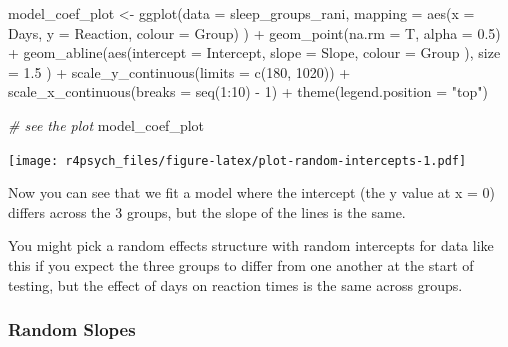 \documentclass[
]{book}
\newenvironment{Shaded}{\begin{snugshade}}{\end{snugshade}}
\newcommand{\AttributeTok}[1]{\textcolor[rgb]{0.77,0.63,0.00}{#1}}
\newcommand{\CommentTok}[1]{\textcolor[rgb]{0.56,0.35,0.01}{\textit{#1}}}
\newcommand{\DecValTok}[1]{\textcolor[rgb]{0.00,0.00,0.81}{#1}}
\newcommand{\FloatTok}[1]{\textcolor[rgb]{0.00,0.00,0.81}{#1}}
\newcommand{\FunctionTok}[1]{\textcolor[rgb]{0.00,0.00,0.00}{#1}}
\newcommand{\NormalTok}[1]{#1}
\newcommand{\OtherTok}[1]{\textcolor[rgb]{0.56,0.35,0.01}{#1}}
\newcommand{\SpecialCharTok}[1]{\textcolor[rgb]{0.00,0.00,0.00}{#1}}
\newcommand{\StringTok}[1]{\textcolor[rgb]{0.31,0.60,0.02}{#1}}
\begin{document}
\begin{Shaded}
\begin{Highlighting}[]
\NormalTok{model\_coef\_plot }\OtherTok{\textless{}{-}} \FunctionTok{ggplot}\NormalTok{(}\AttributeTok{data =}\NormalTok{ sleep\_groups\_rani, }
       \AttributeTok{mapping =} \FunctionTok{aes}\NormalTok{(}\AttributeTok{x =}\NormalTok{ Days, }
                     \AttributeTok{y =}\NormalTok{ Reaction, }
                     \AttributeTok{colour =}\NormalTok{ Group)}
\NormalTok{       ) }\SpecialCharTok{+}
  \FunctionTok{geom\_point}\NormalTok{(}\AttributeTok{na.rm =}\NormalTok{ T, }\AttributeTok{alpha =} \FloatTok{0.5}\NormalTok{) }\SpecialCharTok{+}
  \FunctionTok{geom\_abline}\NormalTok{(}\FunctionTok{aes}\NormalTok{(}\AttributeTok{intercept =}\NormalTok{ Intercept, }
                  \AttributeTok{slope =}\NormalTok{ Slope,}
                  \AttributeTok{colour =}\NormalTok{ Group}
\NormalTok{                  ),}
              \AttributeTok{size =} \FloatTok{1.5}
\NormalTok{              ) }\SpecialCharTok{+}
  \FunctionTok{scale\_y\_continuous}\NormalTok{(}\AttributeTok{limits =} \FunctionTok{c}\NormalTok{(}\DecValTok{180}\NormalTok{, }\DecValTok{1020}\NormalTok{)) }\SpecialCharTok{+}
  \FunctionTok{scale\_x\_continuous}\NormalTok{(}\AttributeTok{breaks =} \FunctionTok{seq}\NormalTok{(}\DecValTok{1}\SpecialCharTok{:}\DecValTok{10}\NormalTok{) }\SpecialCharTok{{-}} \DecValTok{1}\NormalTok{) }\SpecialCharTok{+}
  \FunctionTok{theme}\NormalTok{(}\AttributeTok{legend.position =} \StringTok{"top"}\NormalTok{)}

\CommentTok{\# see the plot}
\NormalTok{model\_coef\_plot}
\end{Highlighting}
\end{Shaded}

\texttt{[image: r4psych\_files/figure-latex/plot-random-intercepts-1.pdf]}

Now you can see that we fit a model where the intercept (the y value at x = 0) differs across the 3 groups, but the slope of the lines is the same.

You might pick a random effects structure with random intercepts for data like this if you expect the three groups to differ from one another at the start of testing, but the effect of days on reaction times is the same across groups.

\hypertarget{random-slopes}{%
\subsubsection{Random Slopes}\label{random-slopes}}
\end{document}

